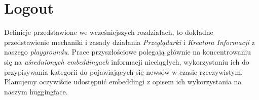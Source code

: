 \section{Logout}

Definicje przedstawione we wcześniejszych rozdziałach, to dokładne przedstawienie
mechaniki i zasady działania \textit{Przeglądarki} i \textit{Kreatora Informacji}
z naszego \textit{playgroundu}. Prace przyszłościowe polegają głównie na koncentrowaniu 
się na \textit{uśrednionych embeddingach} informacji nieciągłych, wykorzystaniu ich do przypisywania
kategorii do pojawiających się newsów w czasie rzeczywistym. Planujemy oczywiście
udostępnić embeddingi z opisem ich wykorzystania na naszym huggingface.